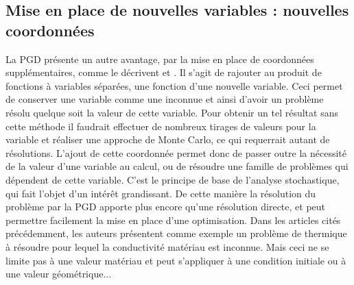 \subsection{Mise en place de nouvelles variables : nouvelles coordonnées}
La PGD présente un autre avantage, par la mise en place de coordonnées supplémentaires, comme le décrivent \cite{Paradigm} et \cite{DDAS}. Il s'agit de rajouter au produit de fonctions à variables séparées, une fonction d'une nouvelle variable. Ceci permet de conserver une variable comme une inconnue et ainsi d'avoir un problème résolu quelque soit la valeur de cette variable. Pour obtenir un tel résultat sans cette méthode il faudrait effectuer de nombreux tirages de valeurs pour la variable et réaliser une approche de Monte Carlo, ce qui requerrait autant de résolutions. L'ajout de cette coordonnée permet donc de passer outre la nécessité de la valeur d'une variable au calcul, ou de résoudre une famille de problèmes qui dépendent de cette variable. C'est le principe de base de l'analyse stochastique, qui fait l'objet d'un intérêt grandissant. De cette manière la résolution du problème par la PGD apporte plus encore qu'une résolution directe, et peut permettre facilement la mise en place d'une optimisation. Dans les articles cités précédemment, les auteurs présentent comme exemple un problème de thermique à résoudre pour lequel la conductivité matériau est inconnue. Mais ceci ne se limite pas à une valeur matériau et peut s'appliquer à une condition initiale ou à une valeur géométrique...
